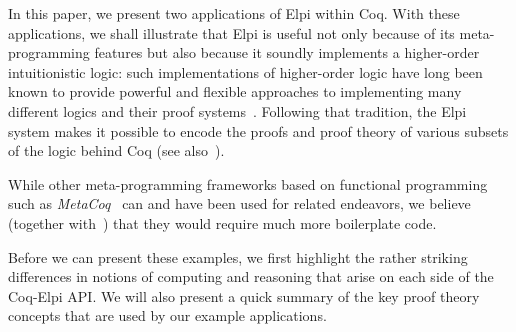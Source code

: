In this paper, we present two applications of Elpi within Coq. With
these applications, we shall illustrate that Elpi is useful not only
because of its meta-programming features but also because it soundly
implements a higher-order intuitionistic logic: such implementations
of higher-order logic have long been known to provide powerful and
flexible approaches to implementing many different logics and their
proof systems~\cite{felty89phd,felty88cade,paulson89jar}.  Following
that tradition, the Elpi system makes it possible to encode the proofs
and proof theory of various subsets of the logic behind Coq 
(see also~\cite{felty93lics}). 

While other meta-programming frameworks based on functional
programming such as \emph{MetaCoq}~\cite{sozeau2020metacoq} can and
have been used for related endeavors, we believe (together
with~\cite{DunchevCT16}) that they would require much more
boilerplate code.

Before we can present these examples, we first highlight the rather
striking differences in notions of computing and reasoning that arise
on each side of the Coq-Elpi API.   We will also present a quick
summary of the key proof theory concepts that are used by our example
applications.


